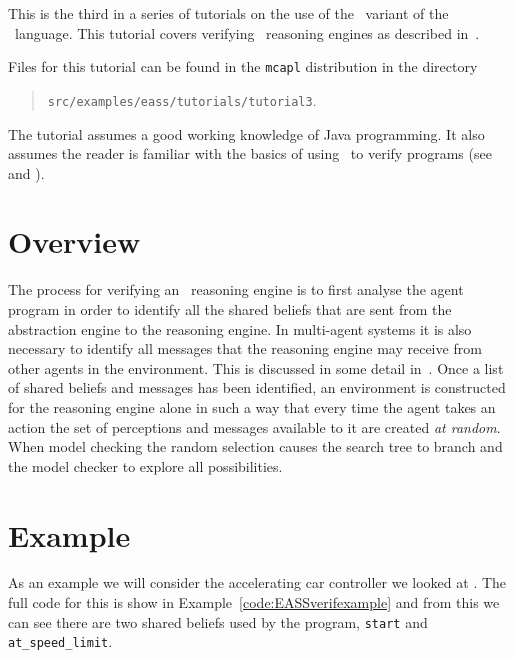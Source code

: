 
This is the third in a series of tutorials on the use of the \eass\ variant of the \gwendolen\ language.  This tutorial covers verifying \eass\ reasoning engines as described in~\cite{dennis14:_pract,DBLP:journals/cacm/FisherDW13}.

Files for this tutorial can be found in the \texttt{mcapl} distribution in the directory 
\begin{quote}
\texttt{src/examples/eass/tutorials/tutorial3}.
\end{quote}

The tutorial assumes a good working knowledge of Java programming.  It also assumes the reader is familiar with the basics of using \ajpf\ to verify programs (see  and ).

\section{Overview}
The process for verifying an \eass\ reasoning engine is to first analyse the agent program in order to identify all the shared beliefs that are sent from the abstraction engine to the reasoning engine.  In multi-agent systems it is also necessary to identify all messages that the reasoning engine may receive from other agents in the environment.  This is discussed in some detail in~\cite{dennis14:_pract}.  Once a list of shared beliefs and messages has been identified, an environment is constructed for the reasoning engine alone in such a way that every time the agent takes an action the set of perceptions and messages available to it are created \emph{at random}.  When model checking the random selection causes the search tree to branch and the model checker to explore all possibilities.

\section{Example}
As an example we will consider the accelerating car controller we looked at .  The full code for this is show in Example~\ref{code:EASSverifexample} and from this we can see there are two shared beliefs used by the program, \lstinline{start} and \lstinline{at_speed_limit}.

